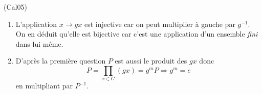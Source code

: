 \begin{tiny}(Cal05)\end{tiny}
\begin{enumerate}
 \item L'application $x\rightarrow gx$ est injective car on peut multiplier à gauche par $g^{-1}$. On en déduit qu'elle est bijective car c'est une application d'un ensemble \emph{fini} dans lui même.
 \item D'après la première question $P$ est aussi le produit des $gx$ donc
\begin{displaymath}
 P = \prod_{x\in G}(gx)=g^m P\Rightarrow g^m = e
\end{displaymath}
en multipliant par $P^{-1}$.
\end{enumerate}
